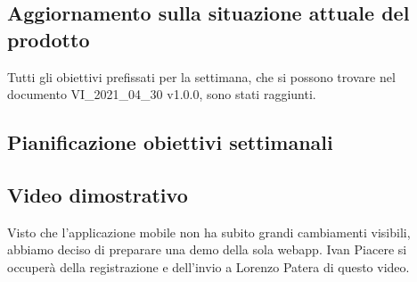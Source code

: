 \subsection*{Aggiornamento sulla situazione attuale del prodotto}
Tutti gli obiettivi prefissati per la settimana, che si possono trovare nel documento VI\_2021\_04\_30 v1.0.0, sono stati raggiunti.
\subsection*{Pianificazione obiettivi settimanali}
\subsection*{Video dimostrativo}
Visto che l'applicazione mobile non ha subito grandi cambiamenti visibili, abbiamo deciso di preparare una demo della sola webapp. Ivan Piacere si occuperà della registrazione e dell'invio a Lorenzo Patera di questo video.

